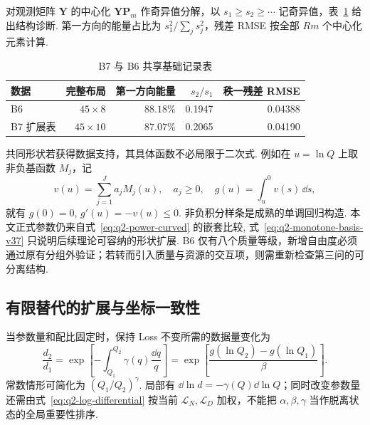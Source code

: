 对观测矩阵 $\mathbf Y$ 的中心化 $\mathbf Y\mathbf P_m$ 作奇异值分解，以 $s_1\ge s_2\ge\cdots$ 记奇异值，表~\ref{tab:q2-rank-diagnostic-v37} 给出结构诊断. 第一方向的能量占比为 $s_1^2/\sum_js_j^2$，残差 RMSE 按全部 $Rm$ 个中心化元素计算. 
\begin{table}[htbp]\centering\small
\caption{B7 与 B6 共享基础记录表}\label{tab:q2-rank-diagnostic-v37}
\begin{tabular}{lrrrr}\toprule
数据 & 完整布局 & 第一方向能量 & $s_2/s_1$ & 秩一残差 RMSE\\\midrule
B6 & $45\times8$ & $88.18\%$ & 0.1947 & 0.04388\\
B7 扩展表 & $45\times10$ & $87.07\%$ & 0.2065 & 0.04190\\\bottomrule
\end{tabular}\end{table}

共同形状若获得数据支持，其具体函数不必局限于二次式. 例如在 $u=\ln Q$ 上取非负基函数 $M_j$，记
\begin{equation}\label{eq:q2-monotone-basis-v37}
v(u)=\sum_{j=1}^Ja_jM_j(u),\quad a_j\ge0,
\quad g(u)=\int_u^0v(s)\,\dd s,
\end{equation}
就有 $g(0)=0$, $g'(u)=-v(u)\le0$. 非负积分样条是成熟的单调回归构造\cite{ramsay_monotone}. 本文正式参数仍来自式~\eqref{eq:q2-power-curved} 的嵌套比较, 式~\eqref{eq:q2-monotone-basis-v37} 只说明后续理论可容纳的形状扩展. B6 仅有八个质量等级，新增自由度必须通过原有分组外验证；若转而引入质量与资源的交互项，则需重新检查第三问的可分离结构. 

\subsection{有限替代的扩展与坐标一致性}

当参数量和配比固定时，保持 Loss 不变所需的数据量变化为
\begin{equation}\label{eq:q2-data-substitution}
\frac{d_2}{d_1}=
\exp\!\left[-\int_{Q_1}^{Q_2}\gamma(q)\frac{\dd q}{q}\right]
=\exp\!\left[\frac{g(\ln Q_2)-g(\ln Q_1)}{\beta}\right].
\end{equation}
常数情形可简化为 $(Q_1/Q_2)^\gamma$. 局部有 $\dd\ln d=-\gamma(Q)\dd\ln Q$；同时改变参数量还需由式~\eqref{eq:q2-log-differential} 按当前 $\mathcal L_N,\mathcal L_D$ 加权，不能把 $\alpha,\beta,\gamma$ 当作脱离状态的全局重要性排序. 

